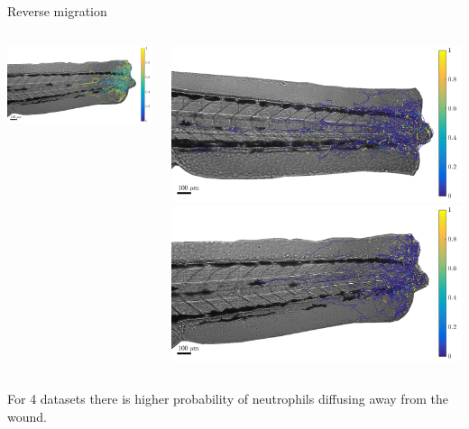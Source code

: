 \documentclass[mathserif,11pt]{beamer}
\begin{document}
\begin{frame}{Reverse migration}
\begin{columns}
\begin{column}{0.31\textwidth}
		\vspace{0.2cm}
		\includegraphics[scale=0.137]{Figures/mode2_rev9.png}
	\end{column}
	\begin{column}{0.31\textwidth}
		\vspace{-0.2cm}
		\includegraphics[scale=0.137]{Figures/mode3_rev2.png}\vfil
		\vspace{0.2cm}
		\includegraphics[scale=0.137]{Figures/mode3_rev9.png}
	\end{column}
\end{columns}
\vspace{0.5cm}
For 4 datasets there is higher probability of neutrophils diffusing away from the wound.
\end{frame}
\end{document}

